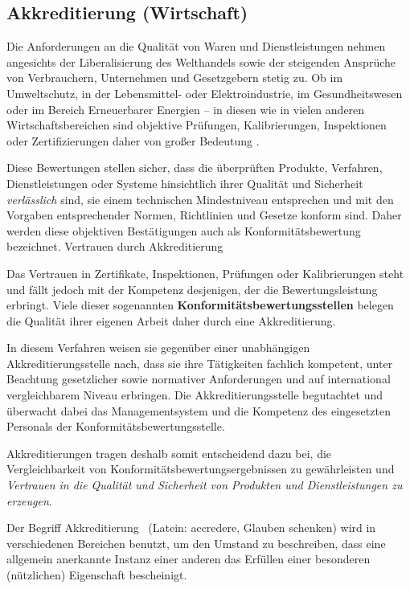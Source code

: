 \subsection{Akkreditierung (Wirtschaft)}
Die Anforderungen an die Qualität von Waren und Dienstleistungen nehmen angesichts der Liberalisierung des Welthandels sowie der steigenden Ansprüche von Verbrauchern, Unternehmen und Gesetzgebern stetig zu. Ob im Umweltschutz, in der Lebensmittel- oder Elektroindustrie, im Gesundheitswesen oder im Bereich Erneuerbarer Energien – in diesen wie in vielen anderen Wirtschaftsbereichen sind objektive Prüfungen, Kalibrierungen, Inspektionen oder Zertifizierungen daher von großer Bedeutung \cite{wiki01}.

Diese Bewertungen stellen sicher, dass die überprüften Produkte, Verfahren, Dienstleistungen oder Systeme hinsichtlich ihrer Qualität und Sicherheit \textit{verlässlich} sind, sie einem technischen Mindestniveau entsprechen und mit den Vorgaben entsprechender Normen, Richtlinien und Gesetze konform sind. Daher werden diese objektiven Bestätigungen auch als Konformitätsbewertung bezeichnet.
Vertrauen durch Akkreditierung

Das Vertrauen in Zertifikate, Inspektionen, Prüfungen oder Kalibrierungen steht und fällt jedoch mit der Kompetenz desjenigen, der die Bewertungsleistung erbringt. Viele dieser sogenannten \textbf{Konformitätsbewertungsstellen} belegen die Qualität ihrer eigenen Arbeit daher durch eine Akkreditierung.

In diesem Verfahren weisen sie gegenüber einer unabhängigen Akkreditierungsstelle nach, dass sie ihre Tätigkeiten fachlich kompetent, unter Beachtung gesetzlicher sowie normativer Anforderungen und auf international vergleichbarem Niveau erbringen. Die Akkreditierungsstelle begutachtet und überwacht dabei das Managementsystem und die Kompetenz des eingesetzten Personals der Konformitätsbewertungsstelle.

Akkreditierungen tragen deshalb somit entscheidend dazu bei, die Vergleichbarkeit von Konformitätsbewertungsergebnissen zu gewährleisten und \textit{Vertrauen in die Qualität und Sicherheit von Produkten und Dienstleistungen zu erzeugen}.

Der Begriff \glqq Akkreditierung \grqq ~(Latein: \glqq accredere\grqq, Glauben schenken) wird in verschiedenen Bereichen benutzt, um den Umstand zu beschreiben, dass eine allgemein anerkannte Instanz einer anderen das Erfüllen einer besonderen (nützlichen) Eigenschaft bescheinigt. 

